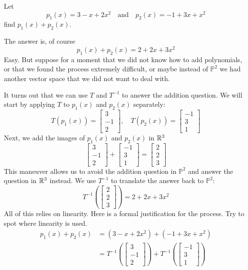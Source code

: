 \documentclass{ximera}
\begin{document}
\begin{exploration}
  Let $$p_1(x)=3-x+2x^2\quad\text{and}\quad p_2(x)=-1+3x+x^2$$ find $p_1(x)+p_2(x)$.  
  
  The answer is, of course
  $$p_1(x)+p_2(x)=2+2x+3x^2$$
  Easy.  But suppose for a moment that we did not know how to add polynomials, or that we found the process extremely difficult, or maybe instead of $\mathbb{P}^2$ we had another vector space that we did not want to deal with. 
  
  It turns out that we can use $T$ and $T^{-1}$ to answer the addition question.  We will start by applying $T$ to $p_1(x)$ and $p_2(x)$ separately:
  $$T(p_1(x))=\begin{bmatrix}3\\-1\\2\end{bmatrix},\quad T(p_2(x))=\begin{bmatrix}-1\\3\\1\end{bmatrix}$$
  Next, we add the images of $p_1(x)$ and $p_2(x)$ in $\mathbb{R}^3$
  $$\begin{bmatrix}3\\-1\\2\end{bmatrix}+\begin{bmatrix}-1\\3\\1\end{bmatrix}=\begin{bmatrix}2\\2\\3\end{bmatrix}$$
  This maneuver allows us to avoid the addition question in $\mathbb{P}^2$ and answer the question in $\mathbb{R}^3$ instead.  We use $T^{-1}$ to translate the answer back to $\mathbb{P}^2$:
  $$T^{-1}\left(\begin{bmatrix}2\\2\\3\end{bmatrix}\right)=2+2x+3x^2$$
  All of this relies on linearity.  Here is a formal justification for the process.  Try to spot where linearity is used.
  \begin{align}
      p_1(x)+p_2(x)&=(3-x+2x^2)+(-1+3x+x^2)\label{steplin1}\\
      &=T^{-1}\left(\begin{bmatrix}3\\-1\\2\end{bmatrix}\right)+T^{-1}\left(\begin{bmatrix}-1\\3\\1\end{bmatrix}\right)\label{steplin2}\\

\end{align}
\end{exploration}
\end{document}
